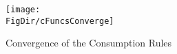 \begin{figure}[tbp]
\centerline{\texttt{[image: \\FigDir/cFuncsConverge]}}
\caption{Convergence of the Consumption Rules}
\label{fig:cFuncsConverge}
\end{figure}
